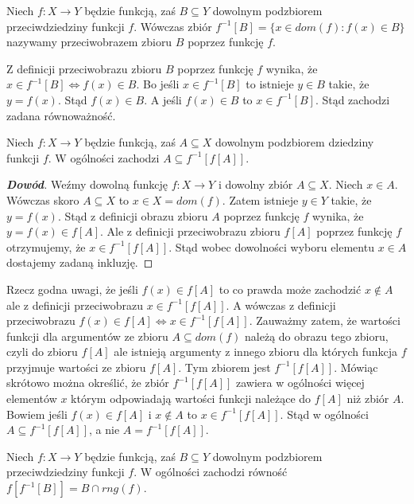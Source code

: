 \begin{definition}
Niech $f:X\rightarrow Y$ będzie funkcją, zaś $B\subseteq Y$ dowolnym podzbiorem przeciwdziedziny funkcji $f$. Wówczas zbiór $f^{-1}[B]=\{x\in dom(f): f(x)\in B\}$ nazywamy przeciwobrazem zbioru $B$ poprzez funkcję $f$.
\end{definition}
\begin{remark}
Z definicji przeciwobrazu zbioru $B$ poprzez funkcję $f$ wynika, że $x\in f^{-1}[B]\iff f(x)\in B$. Bo jeśli $x\in f^{-1}[B]$ to istnieje $y\in B$ takie, że $y=f(x)$. Stąd $f(x)\in B$. A jeśli $f(x)\in B$ to $x\in f^{-1}[B]$. Stąd zachodzi zadana równoważność.
\end{remark}
\begin{property}
Niech $f:X\rightarrow Y$ będzie funkcją, zaś $A\subseteq X$ dowolnym podzbiorem dziedziny funkcji $f$. W ogólności zachodzi $A\subseteq f^{-1}[f[A]]$.
\end{property}
\begin{proof}[\textbf{Dowód}]
Weźmy dowolną funkcję $f:X\rightarrow Y$ i dowolny zbiór $A\subseteq X$. Niech $x\in A$. Wówczas skoro $A\subseteq X$ to $x\in X=dom(f)$. Zatem istnieje $y\in Y$ takie, że $y=f(x)$. Stąd z definicji obrazu zbioru $A$ poprzez funkcję $f$ wynika, że $y=f(x)\in f[A]$. Ale z definicji przeciwobrazu zbioru $f[A]$ poprzez funkcję $f$ otrzymujemy, że $x\in f^{-1}[f[A]]$. Stąd wobec dowolności wyboru elementu $x\in A$ dostajemy zadaną inkluzję.
\end{proof}
\begin{remark}
Rzecz godna uwagi, że jeśli $f(x)\in f[A]$ to co prawda może zachodzić $x\notin A$ ale z definicji przeciwobrazu $x\in f^{-1}[f[A]]$. A wówczas z definicji przeciwobrazu $f(x)\in f[A]\iff x\in f^{-1}[f[A]]$. Zauważmy zatem, że wartości funkcji dla argumentów ze zbioru $A\subseteq dom(f)$ należą do obrazu tego zbioru, czyli do zbioru $f[A]$ ale istnieją argumenty z innego zbioru dla których funkcja $f$ przyjmuje wartości ze zbioru $f[A]$. Tym zbiorem jest $f^{-1}[f[A]]$. Mówiąc skrótowo można określić, że zbiór $f^{-1}[f[A]]$ zawiera w ogólności więcej elementów $x$ którym odpowiadają wartości funkcji należące do $f[A]$ niż zbiór $A$. Bowiem jeśli $f(x)\in f[A]$ i $x\notin A$ to $x\in f^{-1}[f[A]]$. Stąd w ogólności $A\subseteq f^{-1}[f[A]]$, a nie $A=f^{-1}[f[A]]$.
\end{remark}
\begin{property}
Niech $f:X\rightarrow Y$ będzie funkcją, zaś $B\subseteq Y$ dowolnym podzbiorem przeciwdziedziny funkcji $f$. W ogólności zachodzi równość $f[f^{-1}[B]]=B\cap rng(f)$.
\end{property}
